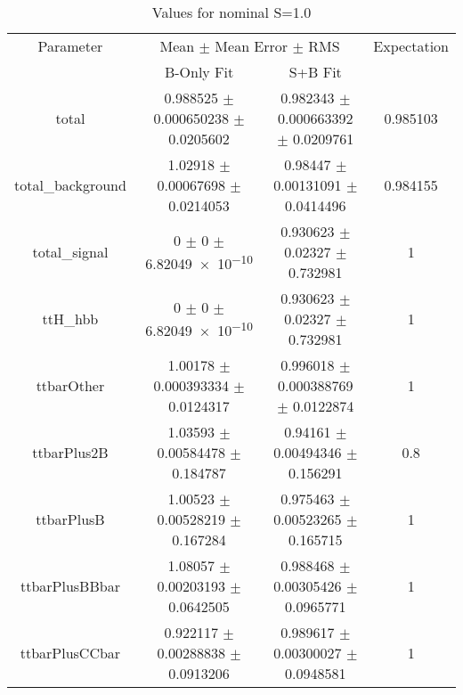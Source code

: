 \begin{table}
\centering
\caption{Values for nominal S=1.0}
\begin{tabular}{cccc}
\toprule
Parameter & \multicolumn{2}{c}{Mean $\pm$ Mean Error $\pm$ RMS} & Expectation\\
 & B-Only Fit & S+B Fit & \\
\midrule
total & \num{0.988525} $\pm$ \num{0.000650238} $\pm$ \num{0.0205602} & \num{0.982343} $\pm$ \num{0.000663392} $\pm$ \num{0.0209761} & \num{0.985103}\\
total\_background & \num{1.02918} $\pm$ \num{0.00067698} $\pm$ \num{0.0214053} & \num{0.98447} $\pm$ \num{0.00131091} $\pm$ \num{0.0414496} & \num{0.984155}\\
total\_signal & \num{0} $\pm$ \num{0} $\pm$ \num{6.82049e-10} & \num{0.930623} $\pm$ \num{0.02327} $\pm$ \num{0.732981} & \num{1}\\
ttH\_hbb & \num{0} $\pm$ \num{0} $\pm$ \num{6.82049e-10} & \num{0.930623} $\pm$ \num{0.02327} $\pm$ \num{0.732981} & \num{1}\\
ttbarOther & \num{1.00178} $\pm$ \num{0.000393334} $\pm$ \num{0.0124317} & \num{0.996018} $\pm$ \num{0.000388769} $\pm$ \num{0.0122874} & \num{1}\\
ttbarPlus2B & \num{1.03593} $\pm$ \num{0.00584478} $\pm$ \num{0.184787} & \num{0.94161} $\pm$ \num{0.00494346} $\pm$ \num{0.156291} & \num{0.8}\\
ttbarPlusB & \num{1.00523} $\pm$ \num{0.00528219} $\pm$ \num{0.167284} & \num{0.975463} $\pm$ \num{0.00523265} $\pm$ \num{0.165715} & \num{1}\\
ttbarPlusBBbar & \num{1.08057} $\pm$ \num{0.00203193} $\pm$ \num{0.0642505} & \num{0.988468} $\pm$ \num{0.00305426} $\pm$ \num{0.0965771} & \num{1}\\
ttbarPlusCCbar & \num{0.922117} $\pm$ \num{0.00288838} $\pm$ \num{0.0913206} & \num{0.989617} $\pm$ \num{0.00300027} $\pm$ \num{0.0948581} & \num{1}\\
\bottomrule
\end{tabular}
\end{table}